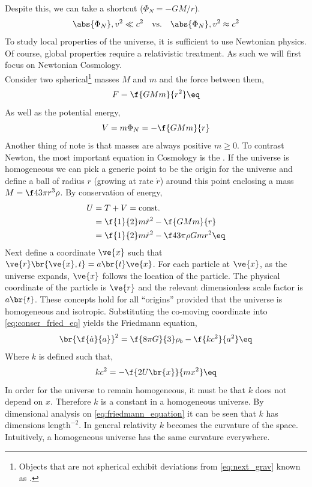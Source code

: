 \documentclass{article}
\begin{document}
Despite this, we can take a shortcut ($\Phi_N = - {GM}/{r}$).
\[ \abs{\Phi_{N}}, v^2 \ll c^2 \quad \text{vs.}\quad \abs{\Phi_{N}}, v^2 \approx c^2 \]
To study local properties of the universe, it is sufficient to use Newtonian physics. Of course, global properties require a relativistic treatment. As such we will first focus on Newtonian Cosmology.\\

Consider two spherical\footnote{Objects that are not spherical exhibit deviations from \cref{eq:next_grav} known as .} masses $M$ and $m$ and the force between them,
\[ F = \f{G M m}{r^2} \eq \label{eq:next_grav} \]
As well as the potential energy,
\[ V = m \Phi_N = -\f{GMm}{r} \]
Another thing of note is that masses are always positive $m \geq 0$. To contrast Newton, the most important equation in Cosmology is the . If the universe is homogeneous we can pick a generic point to be the origin for the universe and define a ball of radius $r$ (growing at rate $\dot{r}$) around this point enclosing a mass $M = \f43 \pi r^3 \rho$. By conservation of energy,
\begin{align*}
U &= T + V = \text{const.} \\
&= \f{1}{2} m \dot{r}^2 - \f{GMm}{r} \\
&= \f{1}{2} m \dot{r}^2 - \f43 \pi \rho G m r^2 \eq \label{eq:conser_fried_eq}
\end{align*}
Next define a  coordinate $\ve{x}$ such that $\ve{r}\br{\ve{x}, t} = a\br{t} \ve{x}$. For each particle at $\ve{x}$, as the universe expands, $\ve{x}$ follows the location of the particle. The physical coordinate of the particle is $\ve{r}$ and the relevant dimensionless scale factor is $a\br{t}$. These concepts hold for all ``origins'' provided that the universe is homogeneous and isotropic. Substituting the co-moving coordinate into \cref{eq:conser_fried_eq} yields the Friedmann equation,
\[ \br{\f{\dot{a}}{a}}^2 = \f{8 \pi G}{3} \rho_b - \f{k c^2}{a^2} \eq \label{eq:friedmann_equation} \]
Where $k$ is defined such that,
\[ k c^2 = - \f{2 U\br{x}}{m x^2} \eq \label{eq:energy_per_particle}\]
In order for the universe to remain homogeneous, it must be that $k$ does not depend on $x$. Therefore $k$ is a constant in a homogeneous universe. By dimensional analysis on \cref{eq:friedmann_equation} it can be seen that $k$ has dimensions $\text{length}^{-2}$. In general relativity $k$ becomes the curvature of the space. Intuitively, a homogeneous universe has the same curvature everywhere. \\
\end{document}

